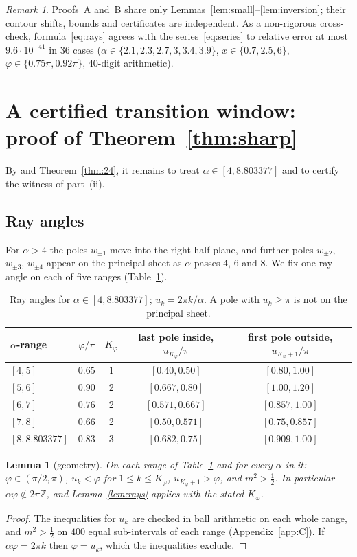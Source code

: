 \documentclass[11pt,a4paper]{article}
\theoremstyle{plain}
\newtheorem{lemma}[theorem]{Lemma}
\theoremstyle{remark}
\newtheorem*{remark}{Remark}
\newcommand{\Z}{\mathbb Z}
\begin{document}
\begin{remark}
Proofs~A and~B share only Lemmas~\ref{lem:small}--\ref{lem:inversion}; their contour shifts,
bounds and certificates are independent. As a non-rigorous cross-check, formula~\eqref{eq:rays}
agrees with the series~\eqref{eq:series} to relative error at most $9.6\cdot10^{-41}$ in $36$ cases
($\alpha\in\{2.1,2.3,2.7,3,3.4,3.9\}$, $x\in\{0.7,2.5,6\}$, $\varphi\in\{0.75\pi,0.92\pi\}$,
40-digit arithmetic).
\end{remark}

\section{A certified transition window: proof of Theorem~\ref{thm:sharp}}\label{sec:sharp}
By \cite[Theorem~A]{FS} and Theorem~\ref{thm:24}, it remains to treat $\alpha\in[4,8.803377]$ and to
certify the witness of part~(ii).

\subsection{Ray angles}
For $\alpha>4$ the poles $w_{\pm1}$ move into the right half-plane, and further poles $w_{\pm2}$,
$w_{\pm3}$, $w_{\pm4}$ appear on the principal sheet as $\alpha$ passes $4$, $6$ and $8$. We fix one
ray angle on each of five ranges (Table~\ref{tab:rays}).

\begin{table}[ht]\centering\small
\begin{tabular}{lcccc}
\toprule
$\alpha$-range & $\varphi/\pi$ & $K_\varphi$ & last pole inside, $u_{K_\varphi}/\pi$ &
 first pole outside, $u_{K_\varphi+1}/\pi$\\
\midrule
$[4,5]$ & $0.65$ & 1 & $[0.40,0.50]$ & $[0.80,1.00]$\\
$[5,6]$ & $0.90$ & 2 & $[0.667,0.80]$ & $[1.00,1.20]$\\
$[6,7]$ & $0.76$ & 2 & $[0.571,0.667]$ & $[0.857,1.00]$\\
$[7,8]$ & $0.66$ & 2 & $[0.50,0.571]$ & $[0.75,0.857]$\\
$[8,8.803377]$ & $0.83$ & 3 & $[0.682,0.75]$ & $[0.909,1.00]$\\
\bottomrule
\end{tabular}
\caption{Ray angles for $\alpha\in[4,8.803377]$; $u_k=2\pi k/\alpha$. A pole with $u_k\ge\pi$ is not
on the principal sheet.}\label{tab:rays}
\end{table}

\begin{lemma}[geometry]\label{lem:geom}
On each range of Table~\ref{tab:rays} and for every $\alpha$ in it: $\varphi\in(\pi/2,\pi)$,
$u_k<\varphi$ for $1\le k\le K_\varphi$, $u_{K_\varphi+1}>\varphi$, and $m^2>\frac12$. In
particular $\alpha\varphi\notin2\pi\Z$, and Lemma~\ref{lem:rays} applies with the stated
$K_\varphi$.
\end{lemma}
\begin{proof}
The inequalities for $u_k$ are checked in ball arithmetic on each whole range, and $m^2>\frac12$
on $400$ equal sub-intervals of each range (Appendix~\ref{app:C}). If $\alpha\varphi=2\pi k$ then
$\varphi=u_k$, which the inequalities exclude.
\end{proof}
\end{document}
